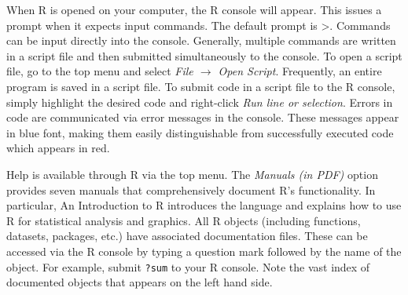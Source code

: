 \documentclass[a4paper]{article}
\begin{document}
When R is opened on your computer, the R console will appear. This issues a prompt when it expects input commands. The default prompt is >. Commands can be input directly into the console. Generally, multiple commands are written in a script file and then submitted simultaneously to the console. To open a script file, go to the top menu and select {\em File $\rightarrow$ Open Script}. Frequently, an entire program is saved in a script file. To submit code in a script file to the R console, simply highlight the desired code and right-click {\em Run line or selection}. Errors in code are communicated via error messages in the console. These messages appear in blue font, making them easily distinguishable from successfully executed code which appears in red.

Help is available through R via the top menu. The \textit{Manuals (in PDF)} option provides seven manuals that comprehensively document R's functionality. In particular, An Introduction to R introduces the language and explains how to use R for statistical analysis and graphics. All R objects (including functions, datasets, packages, etc.) have associated documentation files. These can be accessed via the R console by typing a question mark followed by the name of the object. For example, submit \texttt{?sum} to your R console. Note the vast index of documented objects that appears on the left hand side.
\end{document}
